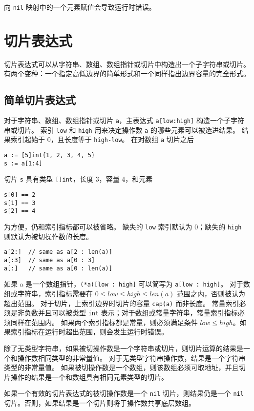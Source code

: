 向 \lstinline|nil| 映射中的一个元素赋值会导致运行时错误。

\section{切片表达式}
切片表达式可以从字符串、数组、数组指针或切片中构造出一个子字符串或切片。
有两个变种：一个指定高低边界的简单形式和一个同样指出边界容量的完全形式。

\subsection{简单切片表达式}
对于字符串、数组、数组指针或切片 \lstinline|a|，主表达式 \lstinline|a[low:high]| 构造一个子字符串或切片。
索引 \lstinline|low| 和 \lstinline|high| 用来决定操作数 \lstinline|a| 的哪些元素可以被选进结果。
结果索引起始于 0，且长度等于 \lstinline|high-low|。
在对数组 \lstinline|a| 切片之后
\begin{lstlisting}[style=golang]
a := [5]int{1, 2, 3, 4, 5}
s := a[1:4]
\end{lstlisting}
切片 \lstinline|s| 具有类型 \lstinline|[]int|，长度 3，容量 4，和元素
\begin{lstlisting}[style=golang]
s[0] == 2
s[1] == 3
s[2] == 4
\end{lstlisting}
为方便，仍和索引指标都可以被省略。
缺失的 \lstinline|low| 索引默认为 0；缺失的 \lstinline|high| 则默认为被切操作数的长度。
\begin{lstlisting}[style=golang]
a[2:]  // same as a[2 : len(a)]
a[:3]  // same as a[0 : 3]
a[:]   // same as a[0 : len(a)]
\end{lstlisting}
如果 a 是一个数组指针，\lstinline|(*a)[low : high]| 可以简写为 \lstinline|a[low : high]|。
对于数组或字符串，索引指标需要在 $0 \leq low \leq high \leq len(a)$ 范围之内，否则被认为超出范围。
对于切片，上索引边界时切片的容量 \lstinline|cap(a)| 而非长度。
常量索引必须是非负数并且可以被类型 \lstinline|int| 表示；对于数组或常量字符串，常量索引指标必须同样在范围内。
如果两个索引指标都是常量，则必须满足条件 $low \leq high$。如果索引指标在运行时超出范围，则会发生运行时错误。

除了无类型字符串，如果被切操作数是一个字符串或切片，则切片运算的结果是一个和操作数相同类型的非常量值。
对于无类型字符串操作数，结果是一个字符串类型的非常量值。
如果被切操作数是一个数组，则该数组必须可取地址，并且切片操作的结果是一个和数组具有相同元素类型的切片。

如果一个有效的切片表达式的被切操作数是一个 \lstinline|nil| 切片，则结果仍是一个 \lstinline|nil| 切片。否则，如果结果是一个切片则将于操作数共享底层数组。

